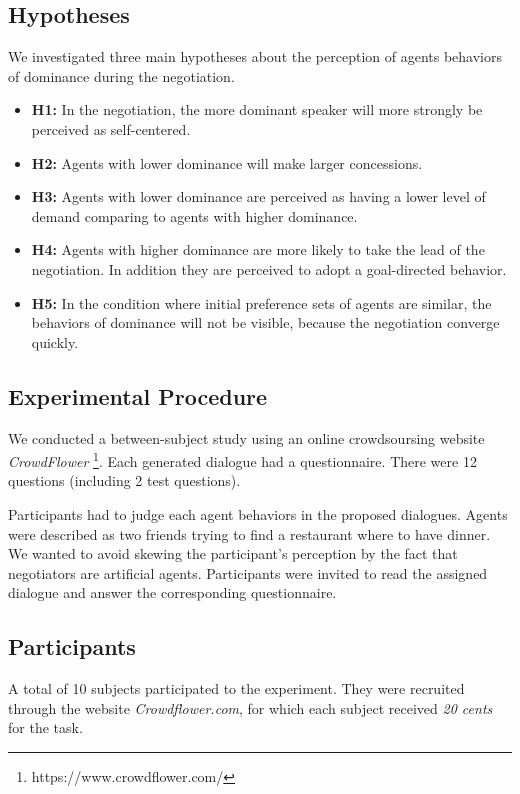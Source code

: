 \documentclass{llncs}
\begin{document}
		\subsection{Hypotheses}
		 We investigated three main hypotheses about the perception of agents behaviors of dominance during the negotiation. 
		 \begin{itemize}
		 	\item  \textbf{H1:} In the negotiation, the more dominant speaker will more strongly be perceived as self-centered.  
		 	
		 	\item \textbf{H2:} Agents with lower dominance will make larger concessions.
		 	
		 	\item \textbf{H3:} Agents with lower dominance are perceived as having a lower level of demand comparing to agents with higher dominance. 
		 	
		 	\item \textbf{H4:} Agents with higher dominance are more likely to take the lead of the negotiation. In addition they are perceived to adopt a goal-directed behavior. 
		 	
		 	\item \textbf{H5:} In the condition where initial preference sets of agents are similar, the behaviors of dominance will not be visible, because the negotiation converge quickly.
		 	
		 \end{itemize}
				
		\subsection{Experimental Procedure}
		
		We conducted a between-subject study using an online crowdsoursing website \emph{CrowdFlower} \footnote{https://www.crowdflower.com/}. 
		Each generated dialogue had a questionnaire. There were 12 questions (including 2 test questions).
		
		Participants had to judge each agent behaviors in the proposed dialogues. Agents were described as two friends trying to find a restaurant where to have dinner. We wanted to avoid skewing the participant's perception by the fact that negotiators are artificial agents. Participants were invited to read the assigned dialogue and answer the corresponding questionnaire. 
		
		\subsection{Participants}
		A total of 10 subjects participated to the experiment. They were recruited through the website \emph{Crowdflower.com}, for which each subject received \textit{20 cents} for the task. 
		
\end{document}
